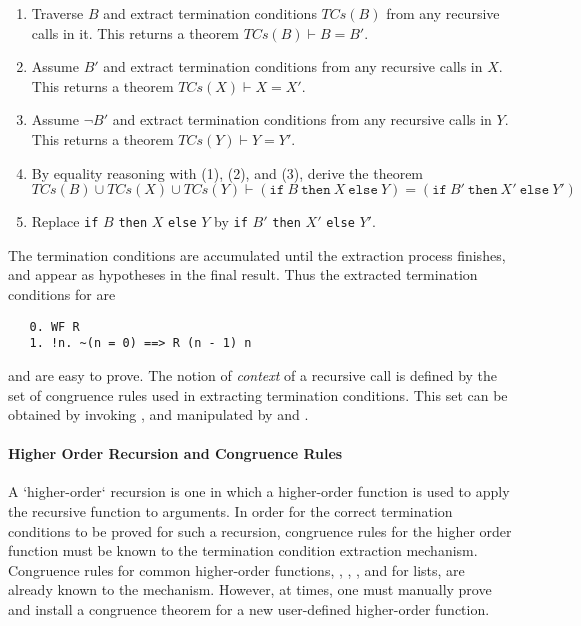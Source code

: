 \begin{enumerate}

\item Traverse $B$ and extract termination conditions
     $\mathit{TCs}(B)$ from any recursive calls in it.
     This returns a theorem $\mathit{TCs}(B) \vdash B = B'$.

\item Assume $B'$ and extract termination conditions from any
  recursive calls in $X$. This returns a theorem
  $\mathit{TCs}(X) \vdash X = X'$.

\item Assume $\neg B'$ and extract termination conditions from any
   recursive calls in $Y$. This returns a theorem
   $\mathit{TCs}(Y) \vdash Y = Y'$.

\item  By equality reasoning with (1), (2), and (3), derive the theorem
\[\mathit{TCs}(B) \cup \mathit{TCs}(X) \cup \mathit{TCs}(Y)
  \vdash
  (\mathtt{if}\ B\ \mathtt{then}\ X\ \mathtt{else}\ Y) =
  (\mathtt{if}\ B'\ \mathtt{then}\ X'\ \mathtt{else}\ Y')
\]
\item Replace \texttt{if} $B$ \texttt{then} $X$ \texttt{else} $Y$ by
\texttt{if} $B'$ \texttt{then} $X'$ \texttt{else} $Y'$.

\end{enumerate}


The termination conditions are accumulated until the
extraction process finishes, and appear as hypotheses in the final
result. Thus the extracted termination conditions for  are
%
\begin{hol}
\begin{verbatim}
   0. WF R
   1. !n. ~(n = 0) ==> R (n - 1) n
\end{verbatim}
\end{hol}
%
and are easy to prove. The notion of \emph{context} of a recursive call
is defined by  the set of congruence rules used in extracting termination
conditions. This set can be obtained by invoking ,
and manipulated by  and .


\paragraph{Higher Order Recursion and Congruence Rules}

A `higher-order` recursion is one in which a higher-order function is
used to apply the recursive function to arguments. In order for the
correct termination conditions to be proved for such a recursion,
congruence rules for the higher order function must be known to the
termination condition extraction mechanism. Congruence rules for
common higher-order functions, \eg, , , and
 for lists, are already known to the
mechanism. However, at times, one must manually prove and install a
congruence theorem for a new user-defined higher-order function.

